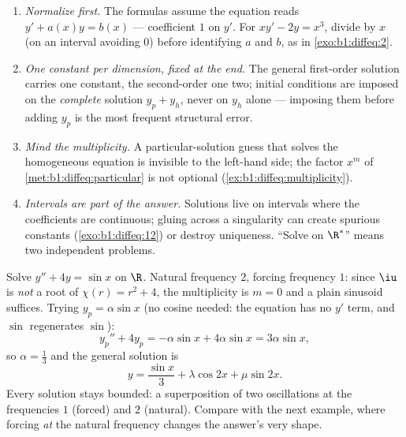 \begin{remark}\label{rem:b1:diffeq:pitfalls}
\begin{enumerate}
  \item \emph{Normalize first.} The formulas assume the equation
        reads $y' + a(x)y = b(x)$ --- coefficient $1$ on $y'$.
        For $xy' - 2y = x^3$, divide by $x$ (on an interval
        avoiding $0$) before identifying $a$ and $b$, as in
        \cref{exo:b1:diffeq:2}.
  \item \emph{One constant per dimension, fixed at the end.} The
        general first-order solution carries one constant, the
        second-order one two; initial conditions are imposed on
        the \emph{complete} solution $y_p + y_h$, never on $y_h$
        alone --- imposing them before adding $y_p$ is the most
        frequent structural error.
  \item \emph{Mind the multiplicity.} A particular-solution guess
        that solves the homogeneous equation is invisible to the
        left-hand side; the factor $x^m$ of
        \cref{met:b1:diffeq:particular} is not optional
        (\cref{ex:b1:diffeq:multiplicity}).
  \item \emph{Intervals are part of the answer.} Solutions live
        on intervals where the coefficients are continuous;
        gluing across a singularity can create spurious constants
        (\cref{exo:b1:diffeq:12}) or destroy uniqueness. ``Solve
        on $\R^*$'' means two independent problems.
\end{enumerate}
\end{remark}

\begin{example}\label{ex:b1:diffeq:offresonance}
Solve $y'' + 4y = \sin x$ on $\R$. Natural frequency $2$, forcing
frequency $1$: since $\iu$ is \emph{not} a root of $\chi(r) = r^2
+ 4$, the multiplicity is $m = 0$ and a plain sinusoid suffices.
Trying $y_p = \alpha\sin x$ (no cosine needed: the equation has
no $y'$ term, and $\sin$ regenerates $\sin$):
\[
y_p'' + 4y_p = -\alpha\sin x + 4\alpha\sin x = 3\alpha\sin x ,
\]
so $\alpha = \frac13$ and the general solution is
\[
y = \frac{\sin x}3 + \lambda\cos 2x + \mu\sin 2x .
\]
Every solution stays bounded: a superposition of two oscillations
at the frequencies $1$ (forced) and $2$ (natural). Compare with
the next example, where forcing \emph{at} the natural frequency
changes the answer's very shape.
\end{example}

